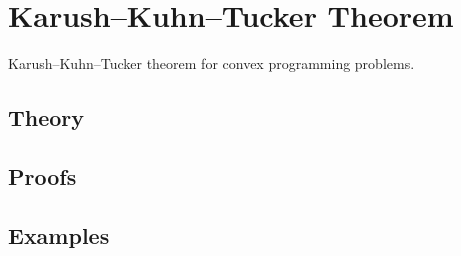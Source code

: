 
\section{Karush–Kuhn–Tucker Theorem}
\label{sec:2.4.07-kkt}

\begin{ticket}
Karush–Kuhn–Tucker theorem for convex programming problems.
\end{ticket}

\subsection*{Theory}

\subsection*{Proofs}

\subsection*{Examples}
